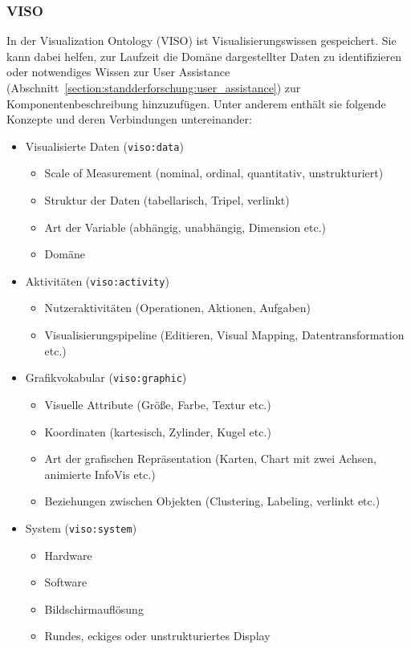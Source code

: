 \documentclass[
	headsepline,
	footsepline,
	fontsize=12pt,
	bibliography=totoc
]{scrbook}
\begin{document}
\subsubsection{VISO}
\label{section:standderforschung:grundlagen:cruise_vizboard:viso}

In der Visualization Ontology (VISO) ist Visualisierungswissen gespeichert. Sie kann dabei helfen, zur Laufzeit die Domäne dargestellter Daten zu identifizieren oder notwendiges Wissen zur User Assistance (Abschnitt~\ref{section:standderforschung:user_assistance}) zur Komponentenbeschreibung hinzuzufügen. Unter anderem enthält sie folgende Konzepte und deren Verbindungen untereinander:

\begin{itemize}
	\item Visualisierte Daten (\texttt{viso:data})
	\begin{itemize}
		\item Scale of Measurement (nominal, ordinal, quantitativ, unstrukturiert)
		\item Struktur der Daten (tabellarisch, Tripel, verlinkt)
		\item Art der Variable (abhängig, unabhängig, Dimension etc.)
		\item Domäne
	\end{itemize}
	\item Aktivitäten (\texttt{viso:activity})
	\begin{itemize}
		\item Nutzeraktivitäten (Operationen, Aktionen, Aufgaben)
		\item Visualisierungspipeline (Editieren, Visual Mapping, Datentransformation etc.)
	\end{itemize}
	\item Grafikvokabular (\texttt{viso:graphic})
	\begin{itemize}
		\item Visuelle Attribute (Größe, Farbe, Textur etc.)
		\item Koordinaten (kartesisch, Zylinder, Kugel etc.)
		\item Art der grafischen Repräsentation (Karten, Chart mit zwei Achsen, animierte InfoVis etc.)
		\item Beziehungen zwischen Objekten (Clustering, Labeling, verlinkt etc.)
	\end{itemize}
	\item System (\texttt{viso:system})
	\begin{itemize}
		\item Hardware
		\item Software
		\item Bildschirmauflösung
		\item Rundes, eckiges oder unstrukturiertes Display
	\end{itemize}
\end{itemize}
\end{document}
